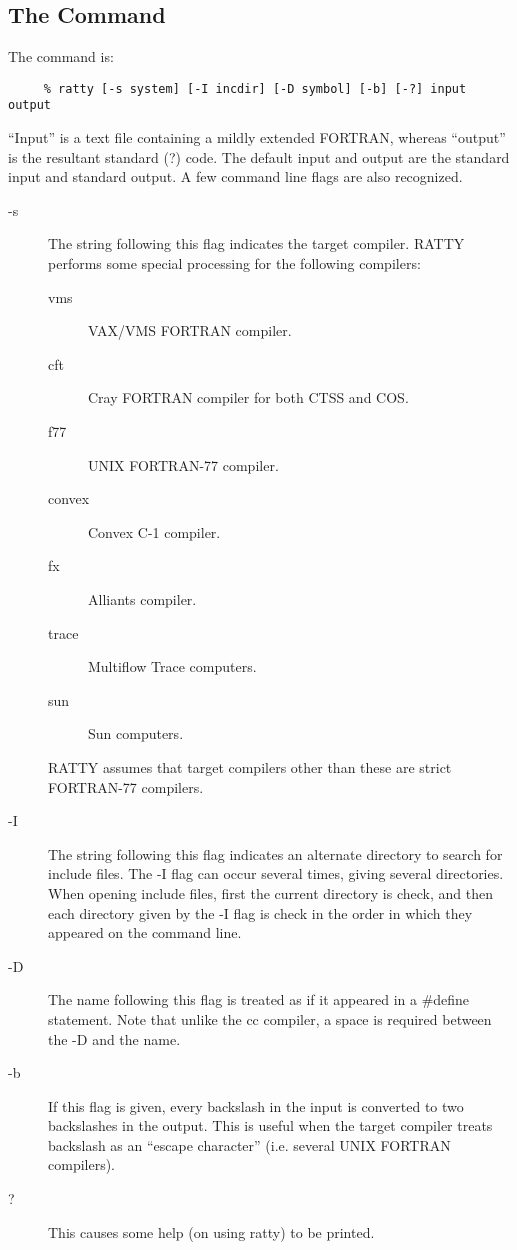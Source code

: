 \subsection{The Command}
The command is:
\begin{verbatim}
     % ratty [-s system] [-I incdir] [-D symbol] [-b] [-?] input output
\end{verbatim}
``Input'' is a text file containing a mildly extended FORTRAN, whereas
``output'' is the resultant standard (?) code. The default input and
output are the standard input and standard output. A few command line
flags are also recognized.
\begin{description}
\item[-s] The string following this flag indicates the target compiler.
RATTY performs some special processing for the following
compilers:
\begin{description}
\item[vms] VAX/VMS FORTRAN compiler.
\item[cft] Cray FORTRAN compiler for both CTSS and COS.
\item[f77] UNIX FORTRAN-77 compiler.
\item[convex] Convex C-1 compiler.
\item[fx] Alliants compiler.
\item[trace] Multiflow Trace computers.
\item[sun] Sun computers.
\end{description}
RATTY assumes that target compilers other than these are strict FORTRAN-77
compilers.
\item[-I] The string following this flag indicates an alternate directory to
search for include files. The -I flag can occur several times, giving several
directories. When opening include files, first the current directory is
check, and then each directory given by the -I flag is check in the order
in which they appeared on the command line.
\item[-D] The name following this flag is treated as if it appeared in a
\#define statement. Note that unlike the cc compiler, a space is required
between the -D and the name.
\item[-b] If this flag is given, every backslash in the input is converted to
two backslashes in the output. This is useful when the target compiler
treats backslash as an ``escape character'' (i.e. several UNIX FORTRAN
compilers).
\item[?] This causes some help (on using ratty) to be printed.
\end{description}

